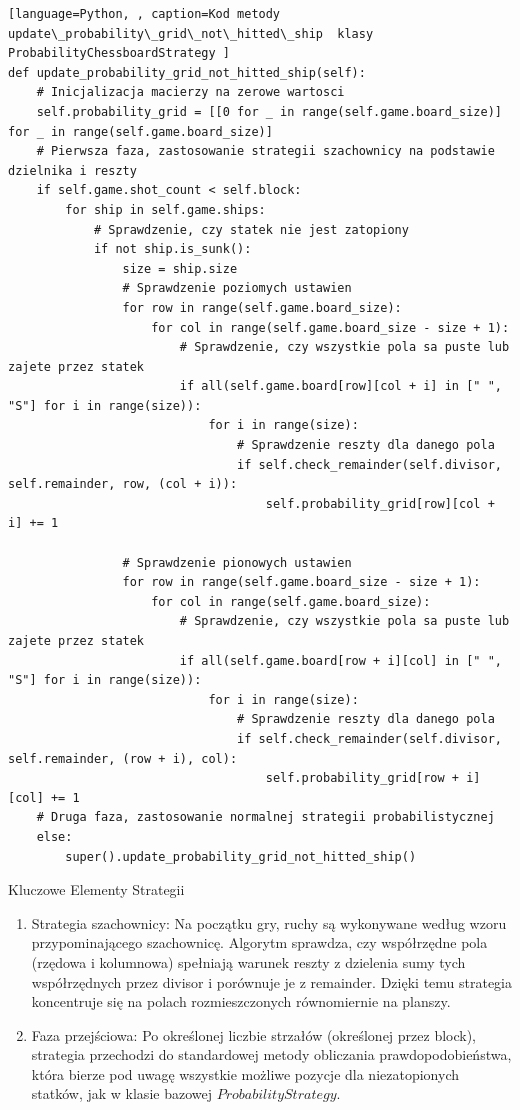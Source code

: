 \documentclass[magisterska]{pracadypl}
\begin{document}
\begin{lstlisting}[language=Python, , caption=Kod metody update\_probability\_grid\_not\_hitted\_ship  klasy ProbabilityChessboardStrategy ] 
def update_probability_grid_not_hitted_ship(self):
    # Inicjalizacja macierzy na zerowe wartosci
    self.probability_grid = [[0 for _ in range(self.game.board_size)] for _ in range(self.game.board_size)]   
    # Pierwsza faza, zastosowanie strategii szachownicy na podstawie dzielnika i reszty
    if self.game.shot_count < self.block:
        for ship in self.game.ships:
            # Sprawdzenie, czy statek nie jest zatopiony
            if not ship.is_sunk():
                size = ship.size
                # Sprawdzenie poziomych ustawien
                for row in range(self.game.board_size):
                    for col in range(self.game.board_size - size + 1):
                        # Sprawdzenie, czy wszystkie pola sa puste lub zajete przez statek
                        if all(self.game.board[row][col + i] in [" ", "S"] for i in range(size)):
                            for i in range(size):
                                # Sprawdzenie reszty dla danego pola
                                if self.check_remainder(self.divisor, self.remainder, row, (col + i)):
                                    self.probability_grid[row][col + i] += 1
                                    
                # Sprawdzenie pionowych ustawien
                for row in range(self.game.board_size - size + 1):
                    for col in range(self.game.board_size):
                        # Sprawdzenie, czy wszystkie pola sa puste lub zajete przez statek
                        if all(self.game.board[row + i][col] in [" ", "S"] for i in range(size)):
                            for i in range(size):
                                # Sprawdzenie reszty dla danego pola
                                if self.check_remainder(self.divisor, self.remainder, (row + i), col):
                                    self.probability_grid[row + i][col] += 1
    # Druga faza, zastosowanie normalnej strategii probabilistycznej
    else:
        super().update_probability_grid_not_hitted_ship()
\end{lstlisting}
Kluczowe Elementy Strategii
\begin{enumerate}
\item Strategia szachownicy: Na początku gry, ruchy są wykonywane według wzoru przypominającego szachownicę. Algorytm sprawdza, czy współrzędne pola (rzędowa i kolumnowa) spełniają warunek reszty z dzielenia sumy tych współrzędnych przez divisor i porównuje je z remainder. Dzięki temu strategia koncentruje się na polach rozmieszczonych równomiernie na planszy.

\item Faza przejściowa: Po określonej liczbie strzałów (określonej przez block), strategia przechodzi do standardowej metody obliczania prawdopodobieństwa, która bierze pod uwagę wszystkie możliwe pozycje dla niezatopionych statków, jak w klasie bazowej $ProbabilityStrategy$.
\end{enumerate}
\end{document}
